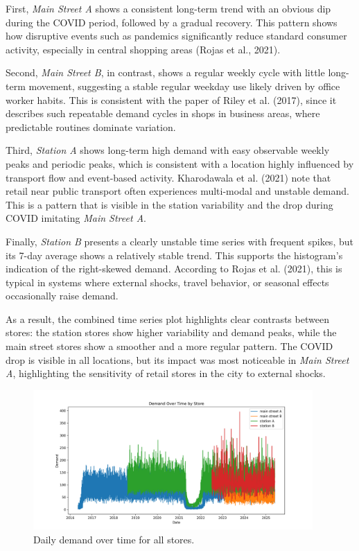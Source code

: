 \documentclass{article}
\begin{document}
First, \emph{Main Street A} shows a consistent long-term trend with an obvious dip during the COVID period, followed by a gradual recovery. This pattern shows how disruptive events such as pandemics significantly reduce standard consumer activity, especially in central shopping areas (Rojas et al., 2021).

Second, \emph{Main Street B}, in contrast, shows a regular weekly cycle with little long-term movement, suggesting a stable regular weekday use likely driven by office worker habits. This is consistent with the paper of Riley et al. (2017), since it describes such repeatable demand cycles in shops in business areas, where predictable routines dominate variation.

Third, \emph{Station A} shows long-term high demand with easy observable weekly peaks and periodic peaks, which is consistent with a location highly influenced by transport flow and event-based activity. Kharodawala et al. (2021) note that retail near public transport often experiences multi-modal and unstable demand. This is a pattern that is visible in the station variability and the drop during COVID imitating \emph{Main Street A}.

Finally, \emph{Station B} presents a clearly unstable time series with frequent spikes, but its 7-day average shows a relatively stable trend. This supports the histogram's indication of the right-skewed demand. According to Rojas et al. (2021), this is typical in systems where external shocks, travel behavior, or seasonal effects occasionally raise demand.

As a result, the combined time series plot highlights clear contrasts between stores: the station stores show higher variability and demand peaks, while the main street stores show a smoother and a more regular pattern. The COVID drop is visible in all locations, but its impact was most noticeable in \emph{Main Street A}, highlighting the sensitivity of retail stores in the city to external shocks.




\begin{figure}[H]
    \centering
    \includegraphics[width=0.95\textwidth]{figures/time_series_all_stores.png}
    \caption{Daily demand over time for all stores.}
    \label{fig:all_timeseries}
\end{figure}
\end{document}
